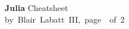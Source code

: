 \documentclass[10pt,landscape]{article}
\newcommand{\header}{
\begin{mdframed}[]
\footnotesize
\sffamily
\Large{\textbf{Julia}} \footnotesize Cheatsheet\\
by~Blair~Labatt~III,~page~\thepage~of~2
\end{mdframed}
}
\begin{document}
\small
\begin{multicols*}{4}
\header










\vfil\,


\end{multicols*}
\end{document}
